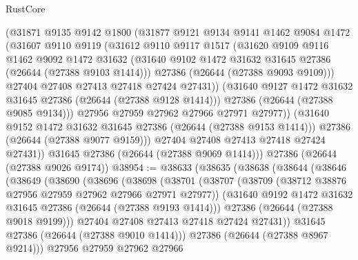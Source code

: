 \begin{lexlean}{RustCore}
\begin{coremodule}
              (@31871
                @9135
                @9142
                @1800
                (@31877
                  @9121
                  @9134
                  @9141
                  @1462
                  @9084
                  @1472
                  (@31607
                    @9110
                    @9119
                    (@31612
                      @9110
                      @9117
                      @1517
                      (@31620
                        @9109
                        @9116
                        @1462
                        @9092
                        @1472
                        @31632
                        (@31640 @9102 @1472 @31632 @31645 @27386 (@26644 (@27388 @9103 @1414)))
                        @27386
                        (@26644 (@27388 @9093 @9109)))
                      @27404
                      @27408
                      @27413
                      @27418
                      @27424
                      @27431))
                  (@31640 @9127 @1472 @31632 @31645 @27386 (@26644 (@27388 @9128 @1414)))
                  @27386
                  (@26644 (@27388 @9085 @9134)))
                @27956
                @27959
                @27962
                @27966
                @27971
                @27977))
            (@31640 @9152 @1472 @31632 @31645 @27386 (@26644 (@27388 @9153 @1414)))
            @27386
            (@26644 (@27388 @9077 @9159)))
          @27404
          @27408
          @27413
          @27418
          @27424
          @27431))
      @31645
      @27386
      (@26644 (@27388 @9069 @1414)))
    @27386
    (@26644 (@27388 @9026 @9174))
@38954 := @38633
    (@38635
      (@38638
        (@38644
          (@38646
            (@38649
              (@38690
                (@38696
                  (@38698
                    (@38701
                      (@38707
                        (@38709 (@38712 @38876 @27956 @27959 @27962 @27966 @27971 @27977))
                        (@31640 @9192 @1472 @31632 @31645 @27386 (@26644 (@27388 @9193 @1414)))
                        @27386
                        (@26644 (@27388 @9018 @9199)))
                      @27404
                      @27408
                      @27413
                      @27418
                      @27424
                      @27431))
                  @31645
                  @27386
                  (@26644 (@27388 @9010 @1414)))
                @27386
                (@26644 (@27388 @8967 @9214)))
              @27956
              @27959
              @27962
              @27966

\end{coremodule}
\end{lexlean}
